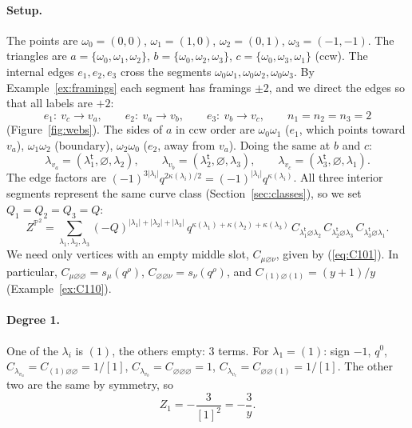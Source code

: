 \documentclass[11pt]{article}
\theoremstyle{plain}
\theoremstyle{definition}
\theoremstyle{remark}
\newcommand{\PP}{\mathbb{P}}
\newcommand{\qrho}{q^{\rho}}
\newcommand{\es}{\varnothing}
\newcommand{\tr}{{\mathsf t}}
\newcommand{\lt}[1]{#1^{\tr}}
\begin{document}
\paragraph{Setup.} The points are $\omega_0=(0,0)$, $\omega_1=(1,0)$, $\omega_2=(0,1)$,
$\omega_3=(-1,-1)$. The triangles are $a=\{\omega_0,\omega_1,\omega_2\}$,
$b=\{\omega_0,\omega_2,\omega_3\}$, $c=\{\omega_0,\omega_3,\omega_1\}$ (ccw). The internal edges
$e_1,e_2,e_3$ cross the segments $\omega_0\omega_1,\omega_0\omega_2,\omega_0\omega_3$. By Example~\ref{ex:framings} each segment
has framings $\pm2$, and we direct the edges so that all labels are $+2$:
\begin{equation}
e_1:\ v_c\rightarrow v_a,\qquad e_2:\ v_a\rightarrow v_b,\qquad e_3:\ v_b\rightarrow v_c,\qquad n_1=n_2=n_3=2
\end{equation}
(Figure~\ref{fig:webs}). The sides of $a$ in ccw order are $\omega_0\omega_1$ ($e_1$, which
points toward $v_a$), $\omega_1\omega_2$ (boundary), $\omega_2\omega_0$ ($e_2$, away from $v_a$).
Doing the same at $b$ and $c$:
\begin{equation}
\lambda_{v_a}=(\lt\lambda_1,\es,\lambda_2),\qquad \lambda_{v_b}=(\lt\lambda_2,\es,\lambda_3),\qquad
\lambda_{v_c}=(\lt\lambda_3,\es,\lambda_1).
\end{equation}
The edge factors are $(-1)^{3|\lambda_i|}q^{2\kappa(\lambda_i)/2}=(-1)^{|\lambda_i|}q^{\kappa(\lambda_i)}$.
All three interior segments represent the same curve class (Section~\ref{sec:classes}), so we
set $Q_1=Q_2=Q_3=Q$:
\begin{equation}\label{eq:ZP2}
Z^{\PP^2}=\sum_{\lambda_1,\lambda_2,\lambda_3}(-Q)^{|\lambda_1|+|\lambda_2|+|\lambda_3|}\,
q^{\kappa(\lambda_1)+\kappa(\lambda_2)+\kappa(\lambda_3)}\,
C_{\lt\lambda_1\es\lambda_2}\,C_{\lt\lambda_2\es\lambda_3}\,C_{\lt\lambda_3\es\lambda_1}.
\end{equation}
We need only vertices with an empty middle slot, $C_{\mu\es\nu}$, given by (\ref{eq:C101}). In
particular, $C_{\mu\es\es}=s_\mu(\qrho)$, $C_{\es\es\nu}=s_\nu(\qrho)$, and
$C_{(1)\es(1)}=(y+1)/y$ (Example~\ref{ex:C110}).

\paragraph{Degree 1.} One of the $\lambda_i$ is $(1)$, the others empty: 3 terms. For
$\lambda_1=(1)$: sign $-1$, $q^0$, $C_{\lambda_{v_a}}=C_{(1)\es\es}=1/[1]$,
$C_{\lambda_{v_b}}=C_{\es\es\es}=1$, $C_{\lambda_{v_c}}=C_{\es\es(1)}=1/[1]$. The other two are the
same by symmetry, so
\begin{equation}
Z_1=-\frac3{[1]^2}=-\frac3y .
\end{equation}
\end{document}
